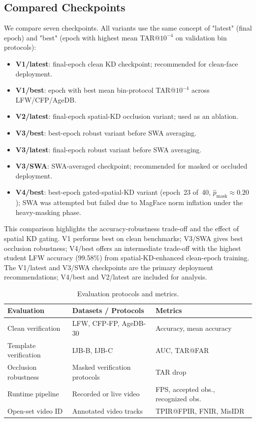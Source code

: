 \subsection{Compared Checkpoints}

We compare seven checkpoints. All variants use the same concept of "latest" (final epoch) and "best" (epoch with highest mean TAR@$10^{-4}$ on validation bin protocols):
\begin{itemize}
    \item \textbf{V1/latest}: final-epoch clean KD checkpoint; recommended for clean-face deployment.
    \item \textbf{V1/best}: epoch with best mean bin-protocol TAR@$10^{-4}$ across LFW/CFP/AgeDB.
    \item \textbf{V2/latest}: final-epoch spatial-KD occlusion variant; used as an ablation.
    \item \textbf{V3/best}: best-epoch robust variant before SWA averaging.
    \item \textbf{V3/latest}: final-epoch robust variant before SWA averaging.
    \item \textbf{V3/SWA}: SWA-averaged checkpoint; recommended for masked or occluded deployment.
    \item \textbf{V4/best}: best-epoch gated-spatial-KD variant (epoch~23 of~40, $\hat{p}_{\text{mask}}\approx0.20$); SWA was attempted but failed due to MagFace norm inflation under the heavy-masking phase.
\end{itemize}

This comparison highlights the accuracy-robustness trade-off and the effect of spatial KD gating. V1 performs best on clean benchmarks; V3/SWA gives best occlusion robustness; V4/best offers an intermediate trade-off with the highest student LFW accuracy (99.58\%) from spatial-KD-enhanced clean-epoch training. The V1/latest and V3/SWA checkpoints are the primary deployment recommendations; V4/best and V2/latest are included for analysis.


\begin{table}[h]
\centering
\caption{Evaluation protocols and metrics.}
\label{tab:evaluation_protocols}
\begin{tabular}{lll}
\hline
\textbf{Evaluation} & \textbf{Datasets / Protocols} & \textbf{Metrics} \\
\hline
Clean verification & LFW, CFP-FP, AgeDB-30 & Accuracy, mean accuracy \\
Template verification & IJB-B, IJB-C & AUC, TAR@FAR \\
Occlusion robustness & Masked verification protocols & TAR drop \\
Runtime pipeline & Recorded or live video & FPS, accepted obs., recognized obs. \\
Open-set video ID & Annotated video tracks & TPIR@FPIR, FNIR, MisIDR \\
\hline
\end{tabular}
\end{table}